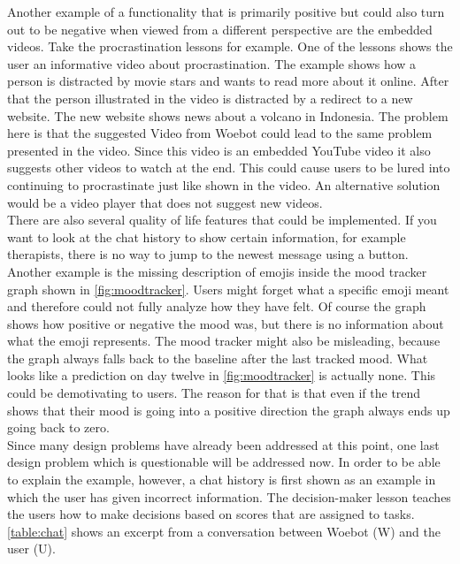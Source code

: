 Another example of a functionality that is primarily positive but could also turn out to be negative when viewed from a different perspective are the embedded videos.
Take the procrastination lessons for example.
One of the lessons shows the user an informative video about procrastination\cite{procrastination-video}.
The example shows how a person is distracted by movie stars and wants to read more about it online.
After that the person illustrated in the video is distracted by a redirect to a new website.
The new website shows news about a volcano in Indonesia.
The problem here is that the suggested Video from Woebot could lead to the same problem presented in the video.
Since this video is an embedded YouTube video it also suggests other videos to watch at the end.
This could cause users to be lured into continuing to procrastinate just like shown in the video.
An alternative solution would be a video player that does not suggest new videos.\\

There are also several quality of life features that could be implemented.
If you want to look at the chat history to show certain information, for example therapists, there is no way to jump to the newest message using a button.
Another example is the missing description of emojis inside the mood tracker graph shown in \autoref{fig:moodtracker}.
Users might forget what a specific emoji meant and therefore could not fully analyze how they have felt.
Of course the graph shows how positive or negative the mood was, but there is no information about what the emoji represents.
The mood tracker might also be misleading, because the graph always falls back to the baseline after the last tracked mood.
What looks like a prediction on day twelve in \autoref{fig:moodtracker} is actually none.
This could be demotivating to users.
The reason for that is that even if the trend shows that their mood is going into a positive direction the graph always ends up going back to zero.\\

Since many design problems have already been addressed at this point, one last design problem which is questionable will be addressed now.
In order to be able to explain the example, however, a chat history is first shown as an example in which the user has given incorrect information.
The decision-maker lesson teaches the users how to make decisions based on scores that are assigned to tasks.
\autoref{table:chat} shows an excerpt from a conversation between Woebot (W) and the user (U).\\

